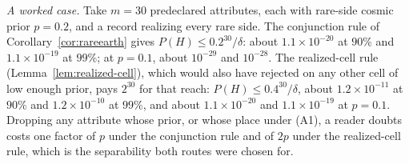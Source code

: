 \noindent \textit{A worked case.} Take $m = 30$ predeclared attributes, each with rare-side cosmic prior $p = 0.2$, and a record realizing every rare side. The conjunction rule of Corollary~\ref{cor:rareearth} gives $P(H) \le 0.2^{30}/\delta$: about $1.1 \times 10^{-20}$ at $90\%$ and $1.1 \times 10^{-19}$ at $99\%$; at $p = 0.1$, about $10^{-29}$ and $10^{-28}$. The realized-cell rule (Lemma~\ref{lem:realized-cell}), which would also have rejected on any other cell of low enough prior, pays $2^{30}$ for that reach: $P(H) \le 0.4^{30}/\delta$, about $1.2 \times 10^{-11}$ at $90\%$ and $1.2 \times 10^{-10}$ at $99\%$, and about $1.1 \times 10^{-20}$ and $1.1 \times 10^{-19}$ at $p = 0.1$. Dropping any attribute whose prior, or whose place under {\rm (A1)}, a reader doubts costs one factor of $p$ under the conjunction rule and of $2p$ under the realized-cell rule, which is the separability both routes were chosen for.

